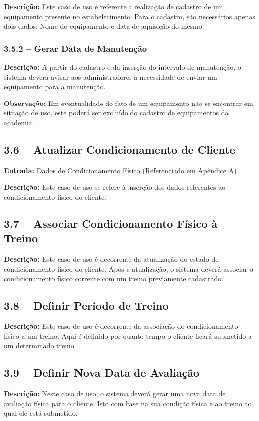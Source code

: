 \documentclass[12pt,a4paper,oneside]{report}
\begin{document}
	\textbf{Descrição:} Este caso de uso é referente a realização de cadastro de um equipamento presente no estabelecimento. Para o cadastro, são necessários apenas dois dados: Nome do equipamento e data de aquisição do mesmo. 
	\subsubsection*{3.5.2 -- Gerar Data de Manutenção}
	\textbf{Descrição:} A partir do cadastro e da inserção do intervalo de manutenção, o sistema deverá avisar aos administradores a necessidade de enviar um equipamento para a manutenção.
	
	
	\textbf{Observação:} Em eventualidade do fato de um equipamento não se encontrar em situação de uso, este poderá ser excluído do cadastro de equipamentos da academia.

	\subsection*{3.6 -- Atualizar Condicionamento de Cliente}
	\textbf{Entrada:} Dados de Condicionamento Físico (Referenciado em Apêndice A)
	
	\textbf{Descrição:} Este caso de uso se refere à inserção dos dados referentes ao condicionamento físico do cliente. 
	\subsection*{3.7 -- Associar Condicionamento Físico à Treino}
	\textbf{Descrição:} Este caso de uso é decorrente da atualização do estado de condicionamento físico do cliente. Após a atualização, o sistema deverá associar o condicionamento físico corrente com um treino previamente cadastrado.
	
	\subsection*{3.8 -- Definir Período de Treino}
	\textbf{Descrição:} Este caso de uso é decorrente da associação do condicionamento físico a um treino. Aqui é definido por quanto tempo o cliente ficará submetido a um determinado treino.
	
	\subsection*{3.9 -- Definir Nova Data de Avaliação}
	\textbf{Descrição:} Neste caso de uso, o sistema deverá gerar uma nova data de avaliação física para o cliente. Isto com base na sua condição física e ao treino ao qual ele está submetido.
	
\end{document}
